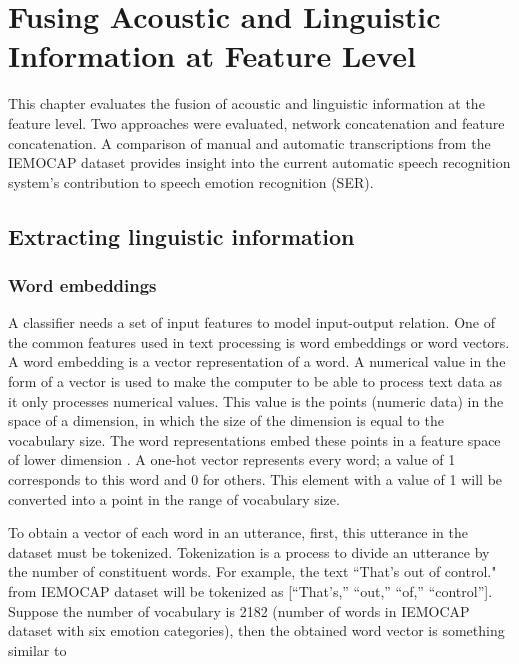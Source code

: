 \chapter{Fusing Acoustic and Linguistic Information at Feature Level}
This chapter evaluates the fusion of acoustic and linguistic information at the
feature level. Two approaches were evaluated, network concatenation and feature
concatenation. A comparison of manual and automatic transcriptions from the
IEMOCAP dataset provides insight into the current automatic speech recognition
system's contribution to speech emotion recognition (SER).

\section{Extracting linguistic information}

\subsection{Word embeddings}
A classifier needs a set of input features to model input-output relation. One
of the common features used in text processing is word embeddings or word
vectors. A word embedding is a vector representation of a word. A numerical
value in the form of a vector is used to make the computer to be able to
process text data as it only processes numerical values. This value is the
points (numeric data) in the space of a dimension, in which the size of the
dimension is equal to the vocabulary size.  The word representations embed
these points in a feature space of lower dimension
\cite{IanGoodfellowYoshuaBengio2015}. A one-hot vector represents every word; a
value of 1 corresponds to this word and 0 for others.  This element with a
value of 1 will be converted into a point in the range of vocabulary size.

To obtain a vector of each word in an utterance, first, this utterance in the
dataset must be tokenized. Tokenization is a process to divide an utterance by
the number of constituent words. For example, the text ``That's out of control."
from IEMOCAP dataset will be tokenized as [``That's,'' ``out,'' ``of,''
``control''].  Suppose the number of vocabulary is 2182 (number of words in
IEMOCAP dataset with six emotion categories), then the obtained word vector is
something similar to

